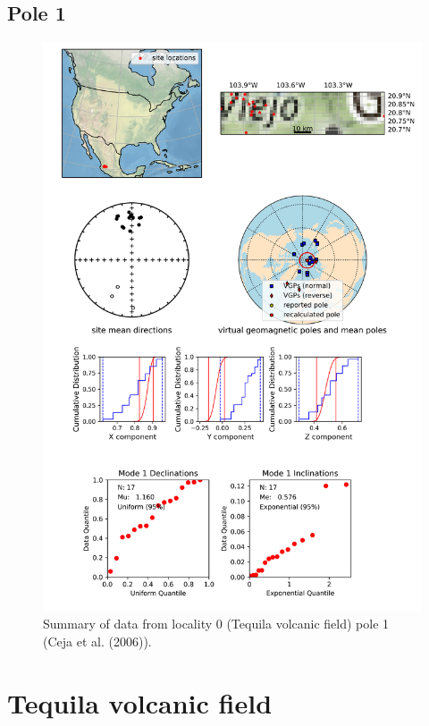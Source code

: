 \subsection{Pole 1}


\begin{figure}[H]
\centering
\includegraphics[width=5 in]{./0/1/pole_summary.png}
\caption{Summary of data from locality 0 (Tequila volcanic field) pole 1 (Ceja et al. (2006)).}
\end{figure}

\section{Tequila volcanic field}
